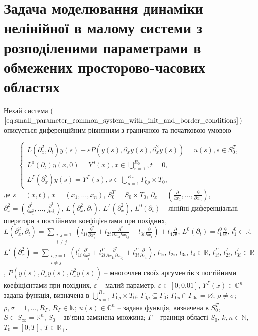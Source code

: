 \section{Задача моделювання динаміки нелінійної в малому системи з розподіленими параметрами в обмежених
просторово-часових областях} \label{sec:sect2_4}

Нехай система ($\ref{eq:small_parameter_common_system_with_init_and_border_conditions}$) описується диференційним рівнянням з граничною  та початковою умовою

\begin{equation}
    \label{eq:small_parameter_common_system_with_init_and_border_conditions}
    \left\{
    \begin{alignedat}{2}
        L(\partial_x^2, \partial_t)y(s) + \varepsilon P(y(s), \partial_x y(s), \partial_x^2 y(s)) = u(s), s\in S_{0}^T, \\
        L^{0}(\partial_{t})y(x, 0) = Y^{0}(x), x\in\bigcup\limits_{r=1}^{R_{0}},t=0,\\
        L^{\Gamma}(\partial^{2}_{x})y(s) = Y^{\Gamma}(s),s\in\bigcup\limits_{\rho=1}^{R_{\Gamma}} \Gamma_{0\rho}\times T_{0},
    \end{alignedat}
    \right.
\end{equation}
де $s=(x,t)$, $x=(x_{1},\dots,x_{n})$, $S_{0}^{T}=S_{0}\times T_{0}$, $\partial_{x}=\left(
\frac{\partial}{\partial x_{1}}, \dots, \frac{\partial}{\partial x_{n}} \right)$,
$\partial^{2}_{x}=\left(\frac{\partial^{2}}{\partial x^{2}_{1}}, \dots, \frac{\partial^{2}}{\partial x^{2}_{n}} \right)$,
$L(\partial_x^2, \partial_t)$, $L^{\Gamma}(\partial^2_{x})$, $L^{0}(\partial_{t})$ -- лінійні диференціальні оператори з постійними коефіцієнтами при похідних,
$
L(\partial_x^2, \partial_t)=\sum\limits_{ \substack{i,j=1\\ i\neq j}}\left(l_{1i} \frac{\partial^2}{\partial x^2_i} +
l_{2i}\frac{\partial^2}{\partial x_{1i}
    \partial x_{1j}} + l_{3i} \frac{\partial}{\partial x_i} \right) + l_4 \frac{\partial}{\partial t}
$,
$
L^{0}(\partial_{t})=l^{0}_{1}\frac{\partial}{\partial t}
$,
$l^{0}_{1}\in\mathbb{R}$,
$
L^{\Gamma}(\partial_x^2)=\sum\limits_{ \substack{i,j=1\\ i\neq j}}\left(l^{\Gamma}_{1i} \frac{\partial^2}{\partial x^2_i} +
l^{\Gamma}_{2i}\frac{\partial^2}{\partial x_{1i}
    \partial x_{1j}} + l^{\Gamma}_{3i} \frac{\partial}{\partial x_i} \right)
$,
$l_{1i}$, $l_{2i}$, $l_{3i}$, $l_{4}\in\mathbb{R}$,
$l^{\Gamma}_{1i}$, $l^{\Gamma}_{2i}$, $l^{\Gamma}_{3i}\in\mathbb{R}$,
$P(y(s), \partial_x y(s), \partial_x^2 y(s))$ -- многочлен  своїх аргументів з постійними
коефіцієнтами при похідних,  $\varepsilon$ – малий параметр, $\varepsilon\in [0; 0.01]$,
$Y^{\Gamma}(x)\in\mathbb{C}^n$ -- задана функція, визначена в
$\bigcup\limits_{\rho=1}^{R_{\Gamma}}\Gamma_{0\rho}\times T_{0}$;
$\Gamma_{0\rho}\subseteq \Gamma_{0}$; $\Gamma_{0\rho}\cap\Gamma_{0\sigma} = \varnothing$;
$\rho\neq\sigma$; $\rho,\sigma = 1,\dots,R_{\Gamma}$, $R_{\Gamma}\in\mathbb{N}$; $u(s)\in\mathbb{C}^n$ --
задана функція, визначена в $S_{0}^{T}$, $S\subset S_{\infty}=\mathbb{R}^{n}$,
$S_{0}$ -- зв'язна замкнена множина; $\Gamma$ -- границя області $S_{0}$, $k,n\in\mathbb{N}$, $T_{0}=[0;T]$,
$T\in\mathbb{R}_{+}$.

